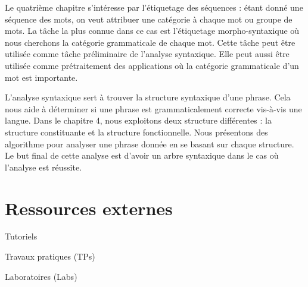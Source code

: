 \documentclass{KodeBook}
\begin{document}
Le quatrième chapitre s'intéresse par l'étiquetage des séquences : étant donné une séquence des mots, on veut attribuer une catégorie à chaque mot ou groupe de mots.
La tâche la plus connue dans ce cas est l'étiquetage morpho-syntaxique où nous cherchons la catégorie grammaticale de chaque mot.
Cette tâche peut être utilisée comme tâche préliminaire de l'analyse syntaxique.
Elle peut aussi être utilisée comme prétraitement des applications où la catégorie grammaticale d'un mot est importante.


L'analyse syntaxique sert à trouver la structure syntaxique d'une phrase.
Cela nous aide à déterminer si une phrase est grammaticalement correcte vis-à-vis une langue.
Dans le chapitre 4, nous exploitons deux structure différentes : la structure constituante et la structure fonctionnelle.
Nous présentons des algorithme pour analyser une phrase donnée en se basant sur chaque structure.
Le but final de cette analyse est d'avoir un arbre syntaxique dans le cas où l'analyse est réussite.




\section*{Ressources externes}

Tutoriels 

Travaux pratiques (TPs)

Laboratoires (Labs)

\ifx\wholebook\relax\else
% 
% 
	
\end{document}
